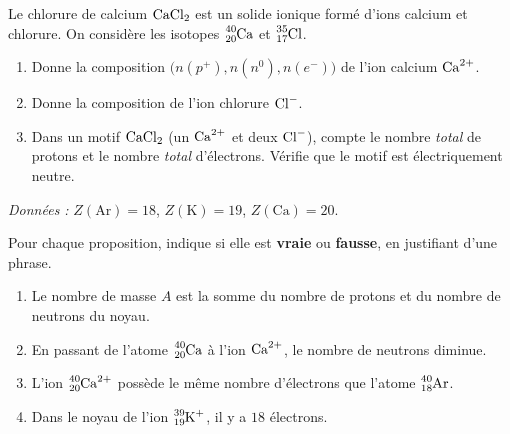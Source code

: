 \documentclass[11pt,a4paper]{article}
\begin{document}
\begin{exo}
Le chlorure de calcium $\ce{CaCl2}$ est un solide ionique formé d'ions calcium et chlorure. On
considère les isotopes $\ce{^{40}_{20}Ca}$ et $\ce{^{35}_{17}Cl}$.
\begin{enumerate}[label=\alph*)]
  \item Donne la composition $\big(n(p^+),n(n^0),n(e^-)\big)$ de l'ion calcium $\ce{Ca^{2+}}$.
  \item Donne la composition de l'ion chlorure $\ce{Cl^{-}}$.
  \item Dans un motif $\ce{CaCl2}$ (un $\ce{Ca^{2+}}$ et deux $\ce{Cl^{-}}$), compte le nombre
        \emph{total} de protons et le nombre \emph{total} d'électrons. Vérifie que le motif est
        électriquement neutre.
\end{enumerate}
\end{exo}

\begin{exo}
\textit{Données :} $Z(\mathrm{Ar})=18$, $Z(\mathrm{K})=19$, $Z(\mathrm{Ca})=20$.

\smallskip
Pour chaque proposition, indique si elle est \textbf{vraie} ou \textbf{fausse}, en justifiant d'une
phrase.
\begin{enumerate}[label=\alph*)]
  \item Le nombre de masse $A$ est la somme du nombre de protons et du nombre de neutrons du noyau.
  \item En passant de l'atome $\ce{^{40}_{20}Ca}$ à l'ion $\ce{Ca^{2+}}$, le nombre de neutrons diminue.
  \item L'ion $\ce{^{40}_{20}Ca^{2+}}$ possède le même nombre d'électrons que l'atome $\ce{^{40}_{18}Ar}$.
  \item Dans le noyau de l'ion $\ce{^{39}_{19}K^{+}}$, il y a $18$ électrons.
\end{enumerate}
\end{exo}
\end{document}
